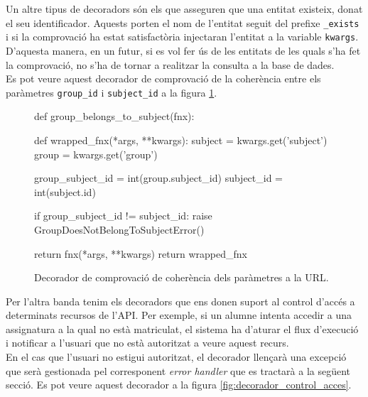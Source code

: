 Un altre tipus de decoradors són els que asseguren que una entitat existeix, donat el seu identificador. Aquests porten el nom de l'entitat seguit del prefixe \texttt{\_exists} i si la comprovació ha estat satisfactòria injectaran l'entitat a la variable \texttt{kwargs}. D'aquesta manera, en un futur, si es vol fer ús de les entitats de les quals s'ha fet la comprovació, no s'ha de tornar a realitzar la consulta a la base de dades.\\

Es pot veure aquest decorador de comprovació de la coherència entre els paràmetres \texttt{group\_id} i \texttt{subject\_id} a la figura \ref{fig:decorador_coherencia}.\\

\begin{figure}[h!]
	\begin{python}
def group_belongs_to_subject(fnx):

	def wrapped_fnx(*args, **kwargs):
		subject = kwargs.get('subject')
		group = kwargs.get('group')
		
		group_subject_id = int(group.subject_id)
		subject_id = int(subject.id)
		
		if group_subject_id != subject_id:
			raise GroupDoesNotBelongToSubjectError()
		
		return fnx(*args, **kwargs)
	return wrapped_fnx
	\end{python}
	\caption{Decorador de comprovació de coherència dels paràmetres a la \ac{URL}.}
	\label{fig:decorador_coherencia}
\end{figure}

Per l'altra banda tenim els decoradors que ens donen suport al control d'accés a determinats recursos de l'\ac{API}. Per exemple, si un alumne intenta accedir a una assignatura a la qual no està matriculat, el sistema ha d'aturar el flux d'execució i notificar a l'usuari que no està autoritzat a veure aquest recurs. \\

En el cas que l'usuari no estigui autoritzat, el decorador llençarà una excepció que serà gestionada pel corresponent \emph{error handler} que es tractarà a la següent secció. Es pot veure aquest decorador a la figura \ref{fig:decorador_control_acces}.\\

